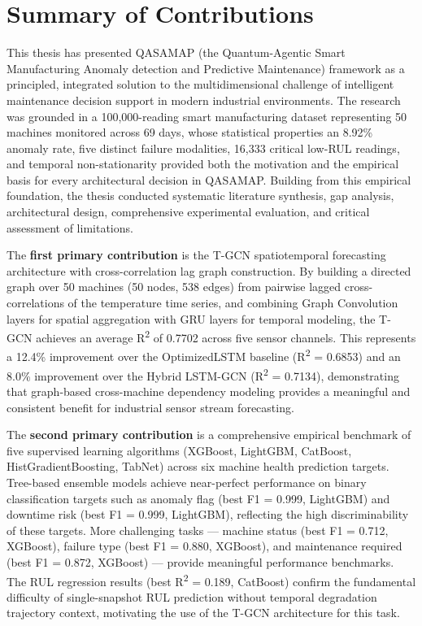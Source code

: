 \section{Summary of Contributions}

This thesis has presented QASAMAP (the Quantum-Agentic Smart Manufacturing Anomaly detection and Predictive Maintenance) framework as a principled, integrated solution to the multidimensional challenge of intelligent maintenance decision support in modern industrial environments. The research was grounded in a 100,000-reading smart manufacturing dataset representing 50 machines monitored across 69 days, whose statistical properties an 8.92\% anomaly rate, five distinct failure modalities, 16,333 critical low-RUL readings, and temporal non-stationarity provided both the motivation and the empirical basis for every architectural decision in QASAMAP. Building from this empirical foundation, the thesis conducted systematic literature synthesis, gap analysis, architectural design, comprehensive experimental evaluation, and critical assessment of limitations.

The \textbf{first primary contribution} is the T-GCN spatiotemporal forecasting architecture with cross-correlation lag graph construction. By building a directed graph over 50 machines (50 nodes, 538 edges) from pairwise lagged cross-correlations of the temperature time series, and combining Graph Convolution layers for spatial aggregation with GRU layers for temporal modeling, the T-GCN achieves an average R\textsuperscript{2} of 0.7702 across five sensor channels. This represents a 12.4\% improvement over the OptimizedLSTM baseline (R\textsuperscript{2} = 0.6853) and an 8.0\% improvement over the Hybrid LSTM-GCN (R\textsuperscript{2} = 0.7134), demonstrating that graph-based cross-machine dependency modeling provides a meaningful and consistent benefit for industrial sensor stream forecasting.

The \textbf{second primary contribution} is a comprehensive empirical benchmark of five supervised learning algorithms (XGBoost, LightGBM, CatBoost, HistGradientBoosting, TabNet) across six machine health prediction targets. Tree-based ensemble models achieve near-perfect performance on binary classification targets such as anomaly flag (best F1 = 0.999, LightGBM) and downtime risk (best F1 = 0.999, LightGBM), reflecting the high discriminability of these targets. More challenging tasks --- machine status (best F1 = 0.712, XGBoost), failure type (best F1 = 0.880, XGBoost), and maintenance required (best F1 = 0.872, XGBoost) --- provide meaningful performance benchmarks. The RUL regression results (best R\textsuperscript{2} = 0.189, CatBoost) confirm the fundamental difficulty of single-snapshot RUL prediction without temporal degradation trajectory context, motivating the use of the T-GCN architecture for this task.

